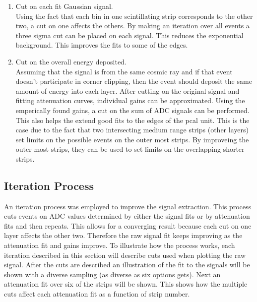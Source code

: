 \begin{enumerate}
    \item Cut on each fit Gaussian signal. \\
        Using the fact that each bin in one scintillating strip corresponds to the other two, a cut on one 
        affects the others. By making an iteration over all events a three sigma cut can be placed on each
         signal. This reduces the exponential background. This improves the fits to some of the edges.
    \item Cut on the overall energy deposited. \\
        Assuming that the signal is from the same cosmic ray and if that event doesn't participate in 
        corner clipping, then the event should deposit the same amount of energy into each layer. After
         cutting on the original signal and fitting attenuation curves, individual gains can be 
         approximated. Using the emperically found gains, a cut on the sum of ADC signals can be 
         performed. This also helps the extend good fits to the edges of the pcal unit. This is 
         the case due to the fact that two intersecting medium range strips (other layers) set 
         limits on the possible events on the outer most strips. By improveing the outer most strips,
          they can be used to set limits on the overlapping shorter strips.  
\end{enumerate}

\FloatBarrier
\subsection{Iteration Process}
An iteration process was employed to improve the signal extraction. This process cuts events on
 ADC values determined by either the signal fits or by attenuation fits and then repeats. This 
 allows for a converging result because each cut on one layer affects the other two. Therefore
  the raw signal fit keeps improving as the attenuation fit and gains improve. To illustrate 
  how the process works, each iteration described in this section will describe cuts used when 
  plotting the raw signal. After the cuts are described an illustration of the fit to the signals 
  will be shown with a diverse sampling (as diverse as six options gets). Next an attenuation 
  fit over six of the strips will be shown. This shows how the multiple cuts affect each attenuation 
  fit as a function of strip number. 

\clearpage
\FloatBarrier
